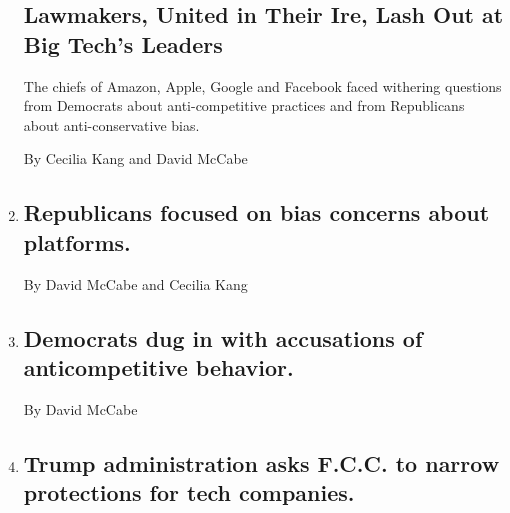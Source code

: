 \begin{enumerate}
{  \subsection{Lawmakers, United in Their Ire, Lash Out at Big Tech's
  Leaders}\label{lawmakers-united-in-their-ire-lash-out-at-big-techs-leaders}}

  The chiefs of Amazon, Apple, Google and Facebook faced withering
  questions from Democrats about anti-competitive practices and from
  Republicans about anti-conservative bias.

  By Cecilia Kang and David McCabe
\item
  \href{/live/2020/07/29/technology/tech-ceos-hearing-testimony/republicans-focused-on-bias-concerns-about-platforms}{}

  \hypertarget{republicans-focused-on-bias-concerns-about-platforms}{%
  \subsection{Republicans focused on bias concerns about
  platforms.}\label{republicans-focused-on-bias-concerns-about-platforms}}

  By David McCabe and Cecilia Kang
\item
  \href{/live/2020/07/29/technology/tech-ceos-hearing-testimony/democrats-dug-in-with-accusations-of-anticompetitive-behavior}{}

  \hypertarget{democrats-dug-in-with-accusations-of-anticompetitive-behavior}{%
  \subsection{Democrats dug in with accusations of anticompetitive
  behavior.}\label{democrats-dug-in-with-accusations-of-anticompetitive-behavior}}

  By David McCabe
\item
  \href{/live/2020/07/29/technology/tech-ceos-hearing-testimony/trump-administration-asks-fcc-to-narrow-protections-for-tech-companies}{}

  \hypertarget{trump-administration-asks-fcc-to-narrow-protections-for-tech-companies}{%
  \subsection{Trump administration asks F.C.C. to narrow protections for
  tech
  companies.}\label{trump-administration-asks-fcc-to-narrow-protections-for-tech-companies}}


\end{enumerate}
